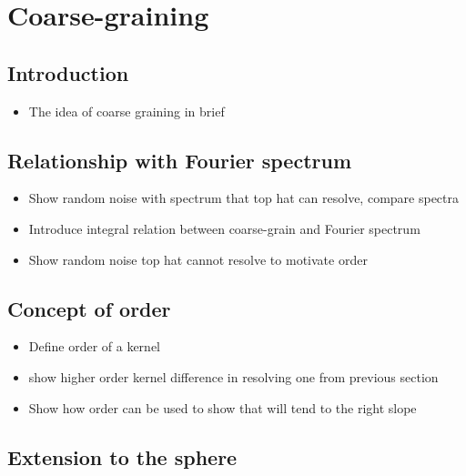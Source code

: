 \chapter{Coarse-graining}
\label{chapter:method} 


\section{Introduction}

\begin{itemize}

\item{The idea of coarse graining in brief}

\end{itemize}

\section{Relationship with Fourier spectrum}

\begin{itemize}

\item{Show random noise with spectrum that top hat can resolve, compare spectra}

\item{Introduce integral relation between coarse-grain and Fourier spectrum}

\item{Show random noise top hat cannot resolve to motivate order}

\end{itemize}

\section{Concept of order}

\begin{itemize}

\item{Define order of a kernel}

\item{show higher order kernel difference in resolving one from previous section}

\item{Show how order can be used to show that will tend to the right slope}

\end{itemize}

\section{Extension to the sphere}

